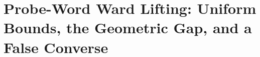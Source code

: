 \section{Probe-Word Ward Lifting: Uniform Bounds, the Geometric Gap, and a False Converse}
\label{sec:probe-word-ward-lifting}

